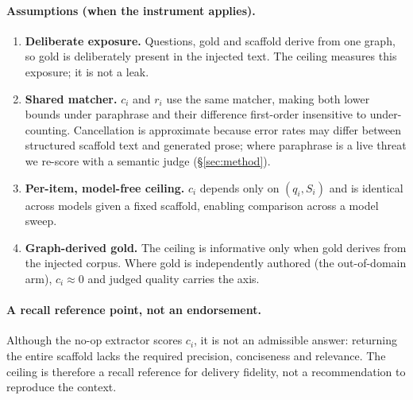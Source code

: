 \documentclass[10pt,twocolumn]{article}
\begin{document}
\paragraph{Assumptions (when the instrument applies).}
\begin{enumerate}[label=(A\arabic*),topsep=2pt,itemsep=1pt,leftmargin=2.4em]
\item \textbf{Deliberate exposure.} Questions, gold and scaffold derive from one graph, so gold is deliberately present in the injected text. The ceiling measures this exposure; it is not a leak.
\item \textbf{Shared matcher.} $c_i$ and $r_i$ use the same matcher, making both lower bounds under paraphrase and their difference first-order insensitive to under-counting. Cancellation is approximate because error rates may differ between structured scaffold text and generated prose; where paraphrase is a live threat we re-score with a semantic judge (\S\ref{sec:method}).
\item \textbf{Per-item, model-free ceiling.} $c_i$ depends only on $(q_i,S_i)$ and is identical across models given a fixed scaffold, enabling comparison across a model sweep.
\item \textbf{Graph-derived gold.} The ceiling is informative only when gold derives from the injected corpus. Where gold is independently authored (the out-of-domain arm), $c_i\approx0$ and judged quality carries the axis.
\end{enumerate}

\paragraph{A recall reference point, not an endorsement.} Although the no-op extractor scores $c_i$, it is not an admissible answer: returning the entire scaffold lacks the required precision, conciseness and relevance. The ceiling is therefore a recall reference for delivery fidelity, not a recommendation to reproduce the context.
\end{document}
